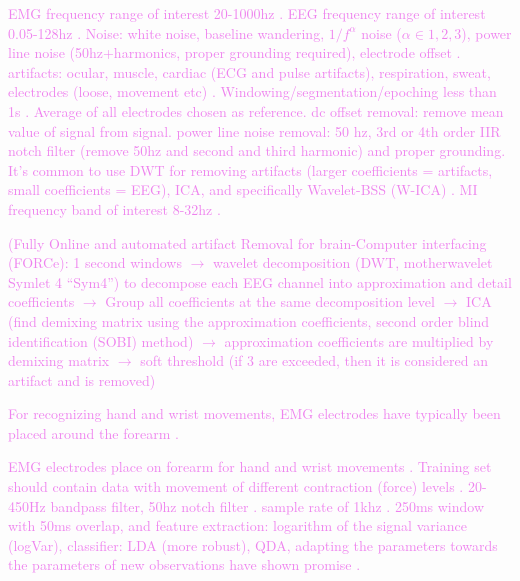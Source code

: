 \textcolor{violet}{EMG frequency range of interest 20-1000hz \cite{islamSignalArtifactsTechniques2021}. EEG frequency range of interest 0.05-128hz \cite{islamSignalArtifactsTechniques2021}. Noise: white noise, baseline wandering, $1/f^\alpha$ noise ($\alpha \in 1,2,3$), power line noise (50hz+harmonics, proper grounding required), electrode offset \cite{islamSignalArtifactsTechniques2021}. artifacts: ocular, muscle, cardiac (ECG and pulse artifacts), respiration, sweat, electrodes (loose, movement etc) \cite{islamSignalArtifactsTechniques2021}. Windowing/segmentation/epoching less than 1s \cite{islamSignalArtifactsTechniques2021}. Average of all electrodes chosen as reference\cite{islamSignalArtifactsTechniques2021}. dc offset removal: remove mean value of signal from signal\cite{islamSignalArtifactsTechniques2021}. power line noise removal: 50 hz, 3rd or 4th order IIR notch filter (remove 50hz and second and third harmonic) and proper grounding\cite{islamSignalArtifactsTechniques2021}. It's common to use DWT for removing artifacts (larger coefficients = artifacts, small coefficients = EEG), ICA, and specifically Wavelet-BSS (W-ICA) \cite{islamSignalArtifactsTechniques2021}. MI frequency band of interest 8-32hz \cite{islamSignalArtifactsTechniques2021}.  }

\textcolor{violet}{(Fully Online and automated artifact Removal for brain-Computer interfacing (FORCe): 1 second windows $\rightarrow$ wavelet decomposition (DWT, motherwavelet Symlet 4 “Sym4”) to decompose each EEG channel into approximation and detail coefficients $\rightarrow$ Group all coefficients at the same decomposition level $\rightarrow$ ICA (find demixing matrix using the approximation coefficients, second order blind identification (SOBI) method) $\rightarrow$ approximation coefficients are multiplied by demixing matrix $\rightarrow$ soft threshold (if 3 are exceeded, then it is considered an artifact and is removed) \cite{dalyFORCeFullyOnline2015}}

\textcolor{violet}{For recognizing hand and wrist movements, EMG electrodes have typically been placed around the forearm \cite{farinaExtractionNeuralInformation2014}. }

\textcolor{violet}{EMG electrodes place on forearm for hand and wrist movements \cite{vidovicImprovingRobustnessMyoelectric2016}. Training set should contain data with movement of different contraction (force) levels \cite{vidovicImprovingRobustnessMyoelectric2016}. 20-450Hz bandpass filter, 50hz notch filter \cite{vidovicImprovingRobustnessMyoelectric2016}. sample rate of 1khz \cite{vidovicImprovingRobustnessMyoelectric2016}. 250ms window with 50ms overlap, and feature extraction: logarithm of the signal variance (logVar), classifier: LDA (more robust), QDA, adapting the parameters towards the parameters of new observations have shown promise \cite{vidovicImprovingRobustnessMyoelectric2016}.     }

